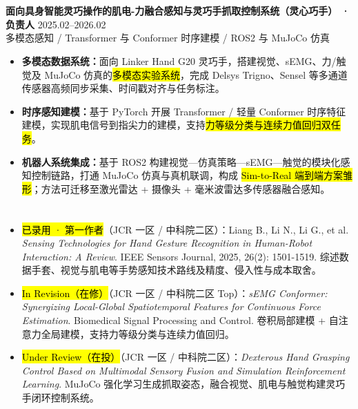 \vspace{0.04em}
\section[科研与项目经历]{}
{\small\textbf{面向具身智能灵巧操作的肌电-力融合感知与灵巧手抓取控制系统（灵心巧手） · 负责人}} \hfill {2025.02--2026.02} \\
{\scriptsize\color{WHU_Blue} 多模态感知 / Transformer 与 Conformer 时序建模 / ROS2 与 MuJoCo 仿真}
\begin{itemize}
    \item \textbf{多模态数据系统：}面向 Linker Hand G20 灵巧手，搭建视觉、sEMG、力/触觉及 MuJoCo 仿真的\hl{多模态实验系统}，完成 Delsys Trigno、Sensel 等多通道传感器高频同步采集、时间戳对齐与任务标注。
    \item \textbf{时序感知建模：}基于 PyTorch 开展 Transformer / 轻量 Conformer 时序特征建模，实现肌电信号到指尖力的建模，支持\hl{力等级分类与连续力值回归双任务}。
    \item \textbf{机器人系统集成：}基于 ROS2 构建视觉—仿真策略—sEMG—触觉的模块化感知控制链路，打通 MuJoCo 仿真与真机联调，构成 \hl{Sim-to-Real 端到端方案雏形}；方法可迁移至激光雷达 + 摄像头 + 毫米波雷达多传感器融合感知。
\end{itemize}

\section[论文与研究成果]{}
\begin{itemize}
    \item \hl{已录用 · 第一作者}（JCR 一区 / 中科院二区）：Liang B., Li N., Li G., et al. \textit{Sensing Technologies for Hand Gesture Recognition in Human-Robot Interaction: A Review}. IEEE Sensors Journal, 2025, 26(2): 1501-1519. 综述数据手套、视觉与肌电等手势感知技术路线及精度、侵入性与成本取舍。%
    \item \hl{In Revision（在修）}（JCR 一区 / 中科院二区 Top）：\textit{sEMG Conformer: Synergizing Local-Global Spatiotemporal Features for Continuous Force Estimation}. Biomedical Signal Processing and Control. 卷积局部建模 + 自注意力全局建模，支持力等级分类与连续力值回归。%
    \item \hl{Under Review（在投）}（JCR 一区 / 中科院二区）：\textit{Dexterous Hand Grasping Control Based on Multimodal Sensory Fusion and Simulation Reinforcement Learning}. MuJoCo 强化学习生成抓取姿态，融合视觉、肌电与触觉构建灵巧手闭环控制系统。%
\end{itemize}

